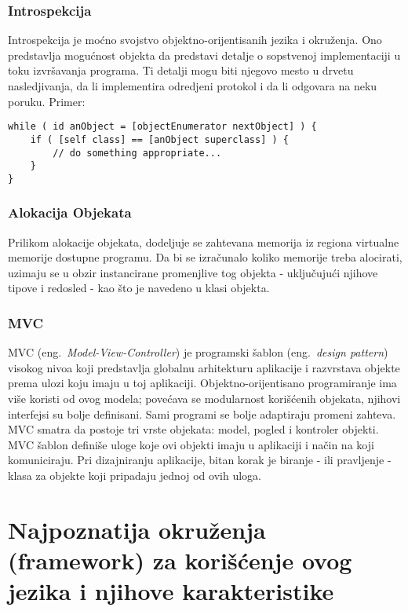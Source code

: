 \documentclass[a4paper]{article}
\begin{document}
\subsubsection{Introspekcija}
Introspekcija je moćno svojstvo objektno-orijentisanih jezika i okruženja. Ono predstavlja mogućnost objekta da predstavi detalje o sopstvenoj implementaciji u toku izvršavanja programa. Ti detalji mogu biti njegovo mesto u drvetu nasledjivanja, da li implementira odredjeni protokol i da li odgovara na neku poruku. Primer: 
\begin{lstlisting}[frame=single]
while ( id anObject = [objectEnumerator nextObject] ) {
    if ( [self class] == [anObject superclass] ) {
        // do something appropriate...
    }
}
\end{lstlisting}
\subsubsection{Alokacija Objekata}
Prilikom alokacije objekata, dodeljuje se zahtevana memorija iz regiona virtualne memorije dostupne programu. Da bi se izračunalo koliko memorije treba alocirati, uzimaju se u obzir instancirane promenjlive tog objekta - uključujući njihove tipove i redosled - kao što je navedeno u klasi objekta.

\subsubsection{MVC}
MVC (eng.~{\em Model-View-Controller}) je programski šablon (eng.~{\em design pattern}) visokog nivoa koji predstavlja globalnu arhitekturu aplikacije i razvrstava objekte prema ulozi koju imaju u toj aplikaciji.
Objektno-orijentisano programiranje ima više koristi od ovog modela; povećava se modularnost korišćenih objekata, njihovi interfejsi su bolje definisani. Sami programi se bolje adaptiraju promeni zahteva.
MVC smatra da postoje tri vrste objekata: model, pogled i kontroler objekti. MVC šablon definiše uloge koje ovi objekti imaju u aplikaciji i način na koji komuniciraju. Pri dizajniranju aplikacije, bitan korak je biranje - ili pravljenje - klasa za objekte koji pripadaju jednoj od ovih uloga. 

\section{Najpoznatija okruženja (framework) za korišćenje ovog jezika i njihove karakteristike}
\label{sec:okruzenja}
\end{document}
